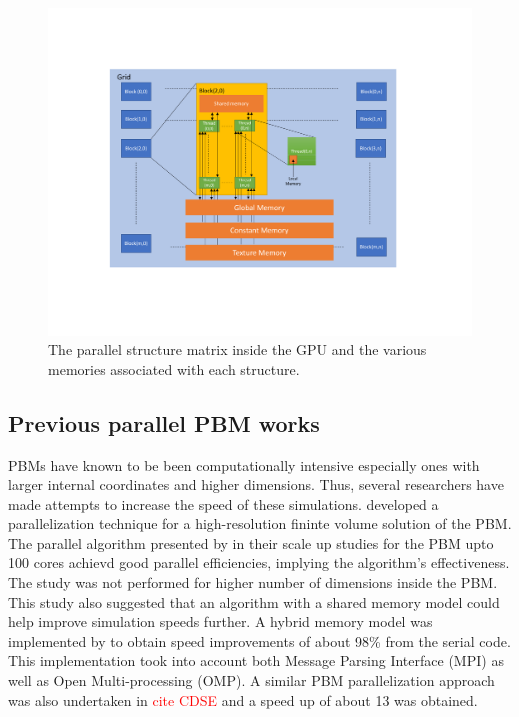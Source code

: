 \documentclass[preprint,10pt,authoryear]{elsarticle}
\begin{document}
\begin{linenumbers}
\begin{figure}
\centering
\includegraphics[scale=0.6]{bkg_gpu_arch.pdf}
\caption{The parallel structure matrix inside the GPU and the various memories associated 
with each structure.}
\label{fig:bkg_gpu_arch}
\end{figure}


\subsection{Previous parallel PBM works}
PBMs have known to be been computationally intensive especially ones with larger internal 
coordinates and higher dimensions. Thus, several researchers have made attempts to increase 
the speed of these simulations. \cite{Gunawan2008} developed a parallelization technique 
for a high-resolution fininte volume solution of the PBM. The parallel algorithm presented by 
\cite{Gunawan2008} in their scale up studies for the PBM upto 100 cores achievd good 
parallel efficiencies, implying the algorithm's effectiveness. The study was not performed for 
higher number of dimensions inside the PBM. This study also suggested that an algorithm 
with a shared memory model could help improve simulation speeds further. A hybrid memory model 
was implemented by \cite{Bettencourt2017} to obtain speed improvements of about 98\% from the 
serial code. This implementation took into account both Message Parsing Interface (MPI) as well 
as Open Multi-processing (OMP). A similar PBM parallelization approach was also undertaken in 
\textcolor{red}{cite CDSE} and a speed up of about 13 was obtained. 


\end{linenumbers}
\end{document}
